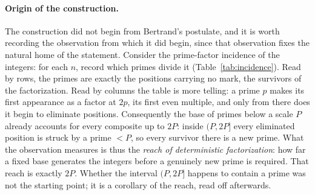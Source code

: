 \documentclass[11pt,a4paper]{amsart}
\theoremstyle{plain}
\theoremstyle{definition}
\theoremstyle{plain}
\theoremstyle{remark}
\begin{document}
\paragraph{Origin of the construction.}
The construction did not begin from Bertrand's postulate, and it is worth recording the
observation from which it did begin, since that observation fixes the natural home of the
statement. Consider the prime-factor incidence of the integers: for each $n$, record which
primes divide it (Table~\ref{tab:incidence}). Read by rows, the primes are exactly the
positions carrying no mark, the survivors of the factorization. Read by columns the table
is more telling: a prime $p$ makes its first appearance as a factor at $2p$, its first even
multiple, and only from there does it begin to eliminate positions. Consequently the base of
primes below a scale $P$ already accounts for every composite up to $2P$: inside $(P,2P]$
every eliminated position is struck by a prime $<P$, so every survivor there is a new prime.
What the observation measures is thus the \emph{reach of deterministic factorization}: how
far a fixed base generates the integers before a genuinely new prime is required. That
reach is exactly $2P$. Whether the interval $(P,2P]$ happens to contain a prime was not the
starting point; it is a corollary of the reach, read off afterwards.
\end{document}
